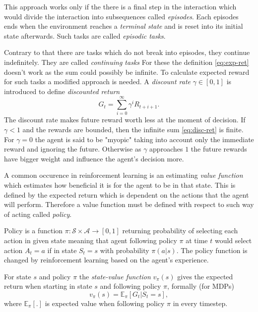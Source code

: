 This approach works only if the there is a final step in the interaction which would divide the interaction into subsequences called \emph{episodes}. Each episodes ends when the environment reaches a \emph{terminal state} and is reset into its initial state afterwards.
Such tasks are called \emph{episodic tasks}. 

Contrary to that there are tasks which do not break into episodes, they continue indefinitely. They are called \emph{continuing tasks} For these the definition \ref{eq:exp-ret} doesn't work as the sum could possibly be infinite. To calculate expected reward for such tasks a modified approach is needed. A \emph{discount rate} $\gamma \in [0,1]$ is introduced to define \emph{discounted return}
\begin{equation}
    \label{eq:disc-ret}
    G_t = \sum_{i=0}^\infty \gamma^iR_{t+i+1}.
\end{equation}
The discount rate makes future reward worth less at the moment of decision. If $\gamma<1$ and the rewards are bounded, then the infinite sum \ref{eq:disc-ret} is finite. For $\gamma=0$ the agent is said to be "myopic" taking into account only the immediate reward and ignoring the future. Otherwise as $\gamma$ approaches $1$ the future rewards have bigger weight and influence the agent's decision more.

A common occurence in reinforcement learning is an estimating \emph{value function} which estimates how beneficial it is for the agent to be in that state. This is defined by the expected return which is dependent on the actions that the agent will perform. Therefore a value function must be defined with respect to such way of acting called \emph{policy}.

Policy is a function $\pi: \mathcal{S} \times \mathcal{A} \rightarrow [0,1]$ returning probability of selecting each action in given state meaning that agent following policy $\pi$ at time $t$ would select action $A_t = a$ if in state $S_t =s$ with probability $\pi(a|s)$. The policy function is changed by reinforcement learning based on the agent's experience.

For state $s$ and policy $\pi$ the \emph{state-value function} $v_\pi(s)$ gives the expected return when starting in state $s$ and following policy $\pi$, formally (for MDPs)
\begin{equation}
    v_\pi(s) = \mathbb{E}_\pi[G_t|S_t=s],
\end{equation}
where $\mathbb{E}_\pi[.]$ is expected value when following policy $\pi$ in every timestep. 

